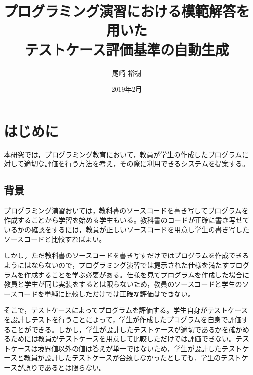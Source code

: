 \documentclass{tpu-sotu}
\author{尾崎 裕樹}
\title{プログラミング演習における模範解答を用いた\\テストケース評価基準の自動生成}
\date{2019年2月}
\begin{document}
%
\maketitle
\clearpage
{}
\tableofcontents
\clearpage
{}
%

%
\chapter{はじめに}
本研究では，プログラミング教育において，教員が学生の作成したプログラムに対して適切な評価を行う方法を考え，その際に利用できるシステムを提案する。
\section{背景}
プログラミング演習おいては，教科書のソースコードを書き写してプログラムを作成することから学習を始める学生もいる。教科書のコードが正確に書き写せているかの確認をするには，教員が正しいソースコードを用意し学生の書き写したソースコードと比較すればよい。

しかし，ただ教科書のソースコードを書き写すだけではプログラムを作成できるようにはならないので，プログラミング演習では提示された仕様を満たすプログラムを作成することを学ぶ必要がある。仕様を見てプログラムを作成した場合に教員と学生が同じ実装をするとは限らないため，教員のソースコードと学生のソースコードを単純に比較しただけでは正確な評価はできない。

そこで，テストケースによってプログラムを評価する。学生自身がテストケースを設計しテストを行うことによって，学生が作成したプログラムを自身で評価することができる。しかし，学生が設計したテストケースが適切であるかを確かめるためには教員がテストケースを用意して比較しただけでは評価できない。テストケースは境界値以外の値は答えが単一ではないため，学生が設計したテストケースと教員が設計したテストケースが合致しなかったとしても，学生のテストケースが誤りであるとは限らない。
\end{document}
